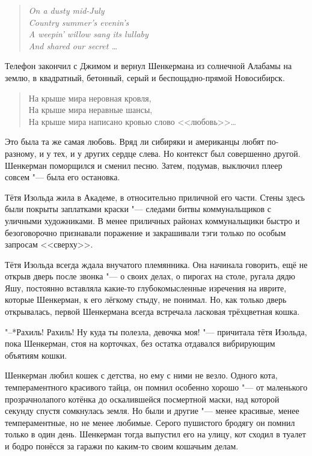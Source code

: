 \begin{verse}
\textit{On a dusty mid-July\\
Country summer's evenin's\\
A weepin' willow sang its lullaby\\
And shared our secret \ldots{}}
\end{verse}

Телефон закончил с Джимом и вернул Шенкермана из солнечной Алабамы на землю, в квадратный, бетонный, серый и беспощадно-прямой Новосибирск.

\begin{verse}
На крыше мира неровная кровля,\\
На крыше мира неравные шансы,\\
На крыше мира написано кровью слово <<любовь>>\ldots{}
\end{verse}

Это была та же самая любовь.
Вряд ли сибиряки и американцы любят по-разному, и у тех, и у других сердце слева.
Но контекст был совершенно другой.
Шенкерман поморщился и сменил песню.
Затем, подумав, выключил плеер совсем "--- была его остановка.

Тётя Изольда жила в Академе, в относительно приличной его части.
Стены здесь были покрыты заплатками краски "--- следами битвы коммунальщиков с уличными художниками.
В менее приличных районах коммунальщики быстро и безоговорочно признавали поражение и закрашивали тэги только по особым запросам <<сверху>>.

Тётя Изольда всегда ждала внучатого племянника.
Она начинала говорить, ещё не открыв дверь после звонка "--- о своих делах, о пирогах на столе, ругала дядю Яшу, постоянно вставляла какие-то глубокомысленные изречения на иврите, которые Шенкерман, к его лёгкому стыду, не понимал.
Но, как только дверь открывалась, первой Шенкермана всегда встречала ласковая трёхцветная кошка.

"--*Рахиль!
Рахиль!
Ну куда ты полезла, девочка моя! "--- причитала тётя Изольда, пока Шенкерман, стоя на корточках, без остатка отдавался вибрирующим объятиям кошки.

Шенкерман любил кошек с детства, но ему с ними не везло.
Одного кота, темпераментного красивого тайца, он помнил особенно хорошо "--- от маленького прозрачнолапого котёнка до оскалившейся посмертной маски, над которой секунду спустя сомкнулась земля.
Но были и другие "--- менее красивые, менее темпераментные, но не менее любимые.
Серого пушистого бродягу он помнил только в один день.
Шенкерман тогда выпустил его на улицу, кот сходил в туалет и бодро понёсся за гаражи по каким-то своим кошачьим делам.

